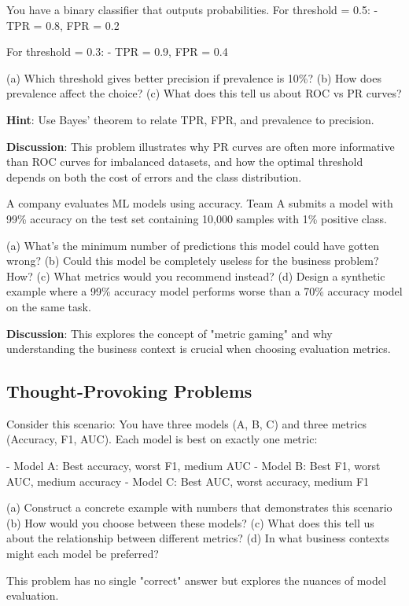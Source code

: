 \documentclass{article}
\newcounter{example}
\newcounter{exercise}
\begin{document}
\begin{tcolorbox}[colback=gray!5!white,colframe=gray!75!black,title=Problem \stepcounter{exercise}\#\theexercise: ROC Curve Analysis]
You have a binary classifier that outputs probabilities. For threshold = 0.5:
- TPR = 0.8, FPR = 0.2

For threshold = 0.3:  
- TPR = 0.9, FPR = 0.4

(a) Which threshold gives better precision if prevalence is 10\%?
(b) How does prevalence affect the choice?
(c) What does this tell us about ROC vs PR curves?

\textbf{Hint}: Use Bayes' theorem to relate TPR, FPR, and prevalence to precision.

\textbf{Discussion}:
This problem illustrates why PR curves are often more informative than ROC curves for imbalanced datasets, and how the optimal threshold depends on both the cost of errors and the class distribution.
\end{tcolorbox}

\begin{tcolorbox}[colback=gray!5!white,colframe=gray!75!black,title=Problem \stepcounter{exercise}\#\theexercise: Metric Gaming]
A company evaluates ML models using accuracy. Team A submits a model with 99\% accuracy on the test set containing 10,000 samples with 1\% positive class.

(a) What's the minimum number of predictions this model could have gotten wrong?
(b) Could this model be completely useless for the business problem? How?
(c) What metrics would you recommend instead?
(d) Design a synthetic example where a 99\% accuracy model performs worse than a 70\% accuracy model on the same task.

\textbf{Discussion}:
This explores the concept of "metric gaming" and why understanding the business context is crucial when choosing evaluation metrics.
\end{tcolorbox}

\subsection{Thought-Provoking Problems}

\begin{tcolorbox}[colback=gray!5!white,colframe=gray!75!black,title=Problem \stepcounter{exercise}\#\theexercise: The Evaluation Paradox]
Consider this scenario: You have three models (A, B, C) and three metrics (Accuracy, F1, AUC). Each model is best on exactly one metric:

- Model A: Best accuracy, worst F1, medium AUC
- Model B: Best F1, worst AUC, medium accuracy  
- Model C: Best AUC, worst accuracy, medium F1

(a) Construct a concrete example with numbers that demonstrates this scenario
(b) How would you choose between these models?
(c) What does this tell us about the relationship between different metrics?
(d) In what business contexts might each model be preferred?

This problem has no single "correct" answer but explores the nuances of model evaluation.
\end{tcolorbox}
\end{document}
